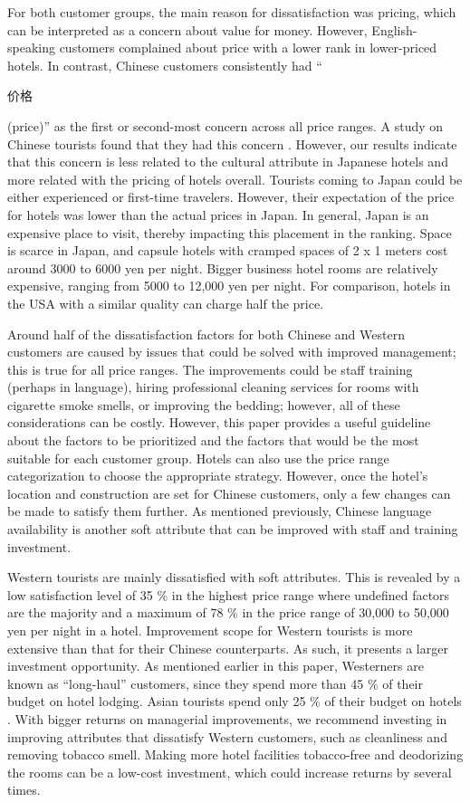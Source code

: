 \documentclass[smallextended,natbib]{svjour3}       %
\begin{document}
    For both customer groups, the main reason for dissatisfaction was pricing, which can be interpreted as a concern about value for money. However, English-speaking customers complained about price with a lower rank in lower-priced hotels. In contrast, Chinese customers consistently had ``\begin{CJK}{UTF8}{gbsn}价格\end{CJK} (price)'' as the first or second-most concern across all price ranges. A study on Chinese tourists found that they had this concern \cite[][]{truong2009}. However, our results indicate that this concern is less related to the cultural attribute in Japanese hotels and more related with the pricing of hotels overall. Tourists coming to Japan could be either experienced or first-time travelers. However, their expectation of the price for hotels was lower than the actual prices in Japan. In general, Japan is an expensive place to visit, thereby impacting this placement in the ranking. Space is scarce in Japan, and capsule hotels with cramped spaces of 2 x 1 meters cost around 3000 to 6000 yen per night. Bigger business hotel rooms are relatively expensive, ranging from 5000 to 12,000 yen per night. For comparison, hotels in the USA with a similar quality can charge half the price.

    Around half of the dissatisfaction factors for both Chinese and Western customers are caused by issues that could be solved with improved management; this is true for all price ranges. The improvements could be staff training (perhaps in language), hiring professional cleaning services for rooms with cigarette smoke smells, or improving the bedding; however, all of these considerations can be costly. However, this paper provides a useful guideline about the factors to be prioritized and the factors that would be the most suitable for each customer group. Hotels can also use the price range categorization to choose the appropriate strategy. However, once the hotel's location and construction are set for Chinese customers, only a few changes can be made to satisfy them further. As mentioned previously, Chinese language availability is another soft attribute that can be improved with staff and training investment.

    Western tourists are mainly dissatisfied with soft attributes. This is revealed by a low satisfaction level of 35 \% in the highest price range where undefined factors are the majority and a maximum of 78 \% in the price range of 30,000 to 50,000 yen per night in a hotel. Improvement scope for Western tourists is more extensive than that for their Chinese counterparts. As such, it presents a larger investment opportunity. As mentioned earlier in this paper, Westerners are known as ``long-haul'' customers, since they spend more than 45 \% of their budget on hotel lodging.
    Asian tourists spend only 25 \% of their budget on hotels \cite[][]{choi2000}. With bigger returns on managerial improvements, we recommend investing in improving attributes that dissatisfy Western customers, such as cleanliness and removing tobacco smell. Making more hotel facilities tobacco-free and deodorizing the rooms can be a low-cost investment, which could increase returns by several times.
\end{document}
